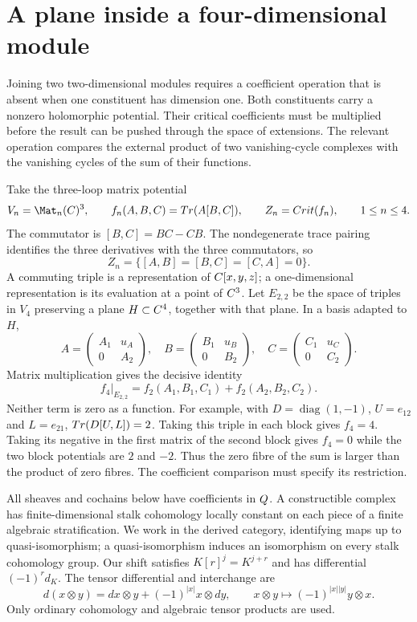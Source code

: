 \section{A plane inside a four-dimensional module}

Joining two two-dimensional modules requires a coefficient operation
that is absent when one constituent has dimension one. Both constituents
carry a nonzero holomorphic potential. Their critical coefficients
must be multiplied before the result can be pushed through the space
of extensions. The relevant operation compares the external product
of two vanishing-cycle complexes with the vanishing cycles of the sum
of their functions.

Take the three-loop matrix potential
\[
 V_n=\Mat_n(\C)^3,\qquad f_n(A,B,C)=\Tr(A[B,C]),
 \qquad Z_n=\Crit(f_n),\qquad 1\le n\le4.
\]
The commutator is $[B,C]=BC-CB$. The nondegenerate trace pairing
identifies the three derivatives with the three commutators, so
\[
 Z_n=\{[A,B]=[B,C]=[C,A]=0\}.
\]
A commuting triple is a representation of $C[x,y,z]$; a one-dimensional
representation is its evaluation at a point of $C^3$.
Let $E_{2,2}$ be the space of triples in $V_4$ preserving a plane
$H\subset C^4$, together with that plane. In a basis adapted to $H$,
\[
 A=\begin{pmatrix}A_1&u_A\\0&A_2\end{pmatrix},\quad
 B=\begin{pmatrix}B_1&u_B\\0&B_2\end{pmatrix},\quad
 C=\begin{pmatrix}C_1&u_C\\0&C_2\end{pmatrix}.
\]
Matrix multiplication gives the decisive identity
\[
                  f_4|_{E_{2,2}}=f_2(A_1,B_1,C_1)+f_2(A_2,B_2,C_2).
\]
Neither term is zero as a function. For example, with
$D=\operatorname{diag}(1,-1)$, $U=e_{12}$ and $L=e_{21}$,
$Tr(D[U,L])=2$. Taking this triple in each block gives $f_4=4$.
Taking its negative in the first matrix of the second block gives
$f_4=0$ while the two block potentials are $2$ and $-2$.
Thus the zero fibre of the sum is larger than the product of zero
fibres. The coefficient comparison must specify its restriction.

All sheaves and cochains below have coefficients in $Q$. A
constructible complex has finite-dimensional stalk cohomology locally
constant on each piece of a finite algebraic stratification. We work
in the derived category, identifying maps up to quasi-isomorphism;
a quasi-isomorphism induces an isomorphism on every stalk cohomology
group. Our shift satisfies $K[r]^j=K^{j+r}$ and has differential
$(-1)^r d_K$. The tensor differential and interchange are
\[
 d(x\otimes y)=dx\otimes y+(-1)^{|x|}x\otimes dy,
 \qquad x\otimes y\longmapsto(-1)^{|x||y|}y\otimes x.
\]
Only ordinary cohomology and algebraic tensor products are used.

